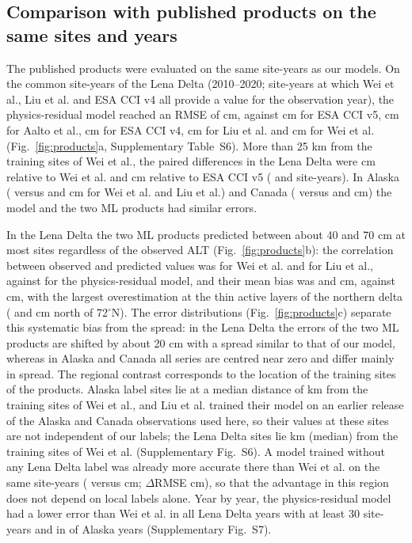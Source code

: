 \subsection{Comparison with published products on the same sites and years}
The published products were evaluated on the same site-years as our models. On the \nccLeN{} common site-years of the Lena Delta (2010--2020; site-years at which Wei et al., Liu et al. and ESA CCI v4 all provide a value for the observation year), the physics-residual model reached an RMSE of \nccLeRoall{} cm, against \nccLeCcifiveall{} cm for ESA CCI v5, \nccLeAaltoall{} cm for Aalto et al., \nccLeCcifourall{} cm for ESA CCI v4, \nccLeLiuall{} cm for Liu et al. and \nccLeWeiall{} cm for Wei et al. (Fig.~\ref{fig:products}a, Supplementary Table~S6). More than 25 km from the training sites of Wei et al., the paired differences in the Lena Delta were \ndprodLeweiRomask{} cm relative to Wei et al. and \ndprodLeccifiveRomask{} cm relative to ESA CCI v5 (\nnprodLeweimask{} and \nnprodLeccifivemask{} site-years). In Alaska (\nccAkRoall{} versus \nccAkWeiall{} and \nccAkLiuall{} cm for Wei et al. and Liu et al.) and Canada (\nccCaRoall{} versus \nccCaWeiall{} and \nccCaLiuall{} cm) the model and the two ML products had similar errors.

In the Lena Delta the two ML products predicted between about 40 and 70 cm at most sites regardless of the observed ALT (Fig.~\ref{fig:products}b): the correlation between observed and predicted values was \nrLeWei{} for Wei et al. and \nrLeLiu{} for Liu et al., against \nrLeRo{} for the physics-residual model, and their mean bias was \nbiasLeAllWei{} and \nbiasLeAllLiu{} cm, against \nbiasLeAllRo{} cm, with the largest overestimation at the thin active layers of the northern delta (\nbiasLeNorthWei{} and \nbiasLeNorthLiu{} cm north of 72$^\circ$N). The error distributions (Fig.~\ref{fig:products}c) separate this systematic bias from the spread: in the Lena Delta the errors of the two ML products are shifted by about 20 cm with a spread similar to that of our model, whereas in Alaska and Canada all series are centred near zero and differ mainly in spread. The regional contrast corresponds to the location of the training sites of the products. Alaska label sites lie at a median distance of \ndistweiAkmed{} km from the training sites of Wei et al., and Liu et al. trained their model on an earlier release of the Alaska and Canada observations used here, so their values at these sites are not independent of our labels; the Lena Delta sites lie \ndistweiLemed{} km (median) from the training sites of Wei et al. (Supplementary Fig.~S6). A model trained without any Lena Delta label was already more accurate there than Wei et al. on the same site-years (\ntlvprmseLeRsWeizero{} versus \ntlvprmseLeWeizero{} cm; $\Delta$RMSE \ntlvpLeRsWeizero{} cm), so that the advantage in this region does not depend on local labels alone. Year by year, the physics-residual model had a lower error than Wei et al. in all \nywLen{} Lena Delta years with at least 30 site-years and in \nywAkRoWeiwin{} of \nywAkRoWein{} Alaska years (Supplementary Fig.~S7).

